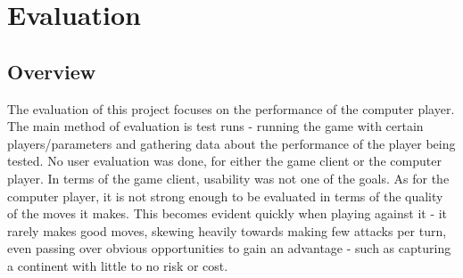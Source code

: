 \graphicspath{ {./Images/} }
\chapter{Evaluation}
\label{evaluation}
\section{Overview}
\label{evalOverview}
The evaluation of this project focuses on the performance of the computer player. The main method of evaluation is test runs - running the game with certain players/parameters and gathering data about the performance of the player being tested. No user evaluation was done, for either the game client or the computer player. In terms of the game client, usability was not one of the goals. As for the computer player, it is not strong enough to be evaluated in terms of the quality of the moves it makes. This becomes evident quickly when playing against it - it rarely makes good moves, skewing heavily towards making few attacks per turn, even passing over obvious opportunities to gain an advantage - such as capturing a continent with little to no risk or cost.